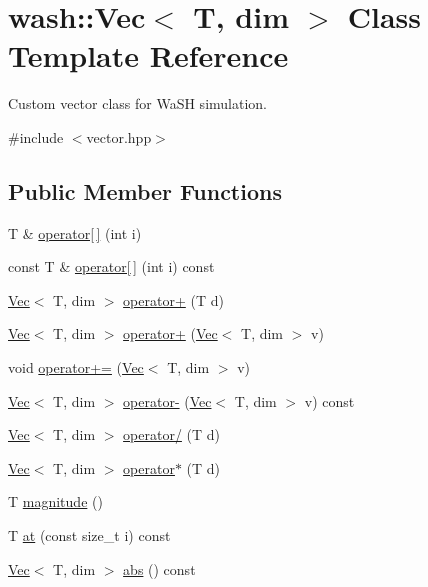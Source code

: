 \hypertarget{classwash_1_1Vec}{}\section{wash\+:\+:Vec$<$ T, dim $>$ Class Template Reference}
\label{classwash_1_1Vec}


Custom vector class for Wa\+SH simulation.  




{\ttfamily \#include $<$vector.\+hpp$>$}

\subsection*{Public Member Functions}
\begin{DoxyCompactItemize}
\item 
T \& \mbox{\hyperlink{classwash_1_1Vec_ac9bf604894ed27189131909371e5af70}{operator\mbox{[}$\,$\mbox{]}}} (int i)
\item 
const T \& \mbox{\hyperlink{classwash_1_1Vec_a751a7a202ad5e726937568887700a954}{operator\mbox{[}$\,$\mbox{]}}} (int i) const
\item 
\mbox{\hyperlink{classwash_1_1Vec}{Vec}}$<$ T, dim $>$ \mbox{\hyperlink{classwash_1_1Vec_ad8a8863138b26c2b2eae41e11f40e78f}{operator+}} (T d)
\item 
\mbox{\hyperlink{classwash_1_1Vec}{Vec}}$<$ T, dim $>$ \mbox{\hyperlink{classwash_1_1Vec_a951a842c43b3cf99d60abfe73e53475c}{operator+}} (\mbox{\hyperlink{classwash_1_1Vec}{Vec}}$<$ T, dim $>$ v)
\item 
void \mbox{\hyperlink{classwash_1_1Vec_ac92d90da0a36cdd6b38a8a12e341fa84}{operator+=}} (\mbox{\hyperlink{classwash_1_1Vec}{Vec}}$<$ T, dim $>$ v)
\item 
\mbox{\hyperlink{classwash_1_1Vec}{Vec}}$<$ T, dim $>$ \mbox{\hyperlink{classwash_1_1Vec_a83a86542f9afb7ea0b5b7b8ab72eb119}{operator-\/}} (\mbox{\hyperlink{classwash_1_1Vec}{Vec}}$<$ T, dim $>$ v) const
\item 
\mbox{\hyperlink{classwash_1_1Vec}{Vec}}$<$ T, dim $>$ \mbox{\hyperlink{classwash_1_1Vec_a972cde51776de1a9efec7ed6ea02f401}{operator/}} (T d)
\item 
\mbox{\hyperlink{classwash_1_1Vec}{Vec}}$<$ T, dim $>$ \mbox{\hyperlink{classwash_1_1Vec_a6fc9e30b352c72c7307bd28ee6c0aa72}{operator$\ast$}} (T d)
\item 
T \mbox{\hyperlink{classwash_1_1Vec_a41de499daf12160b2cf515ce0c9da70f}{magnitude}} ()
\item 
T \mbox{\hyperlink{classwash_1_1Vec_a1be26013b6d4f898b8504fc258043400}{at}} (const size\+\_\+t i) const
\item 
\mbox{\hyperlink{classwash_1_1Vec}{Vec}}$<$ T, dim $>$ \mbox{\hyperlink{classwash_1_1Vec_aae15a1a2cea7e883e53c2e7f6164710a}{abs}} () const
\end{DoxyCompactItemize}
